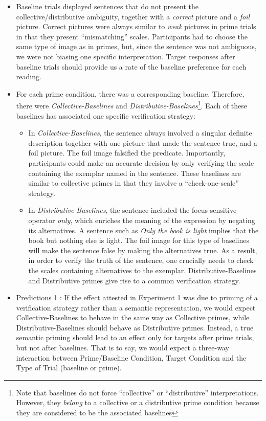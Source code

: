 \documentclass[a4paper]{article}
\begin{document}
\begin{itemize}
\item Baseline trials displayed sentences that do not present the collective/distributive ambiguity, together with a \emph{correct} picture and a \emph{foil} picture. Correct pictures were always similar to \emph{weak} pictures in prime trials in that they present ``mismatching'' scales. Participants had to choose the same type of image as in primes, but, since the sentence was not ambiguous, we were not biasing one specific interpretation. 
Target responses after baseline trials should provide us a rate of the baseline preference for each reading.  

\item For each prime condition, there was a corresponding baseline. Therefore, there were  \emph{Collective-Baselines} and \emph{Distributive-Baselines}\footnote{Note that baselines do not force ``collective'' or ``distributive'' interpretations. However, they \emph{belong} to a collective or a distributive prime condition because they are considered to be the associated baselines}. Each of these baselines has associated one specific verification strategy:
\begin{itemize}
\item In \textit{Collective-Baselines}, the sentence always involved a singular definite description together with one picture that made the sentence true, and a foil picture. The foil image falsified the predicate. Importantly, participants could make an accurate decision by only verifying the scale containing the exemplar named in the sentence. These baselines are similar to collective primes in that they involve a ``check-one-scale'' strategy. 
\item In \textit{Distributive-Baselines}, the sentence included the focus-sensitive operator \emph{only}, which enriches the meaning of the expression by negating its alternatives. A sentence such as \textit{Only the book is light} implies that the book but nothing else is light.  The foil image for this type of baselines will make the sentence false by making the alternatives true. As a result, in order to verify the truth of the sentence, one crucially needs to check the scales containing alternatives to the exemplar. Distributive-Baselines and  Distributive primes give rise to a common verification strategy. 
\end{itemize} 

\item Predictions 1 : If the effect attested in Experiment 1 was due to priming of a verification strategy rather than a semantic representation, we would expect Collective-Baselines to behave in the same way as Collective primes, while Distributive-Baselines should behave as Distributive primes. Instead, a true semantic priming should lead to an effect only for targets after prime trials, but not after baselines. That is to say, we would expect a three-way interaction between Prime/Baseline Condition, Target Condition and the Type of Trial (baseline or prime). 


\end{itemize}
\end{document}
